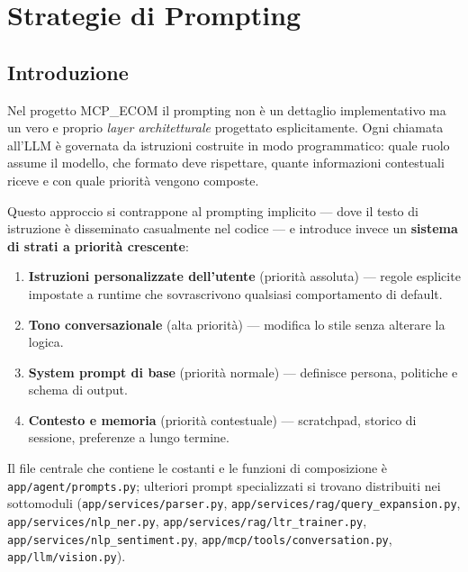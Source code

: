 
\chapter{Strategie di Prompting}
\label{chap:prompting}

\section{Introduzione}
\label{sec:prompt-intro}

Nel progetto MCP\_ECOM il prompting non è un dettaglio implementativo ma
un vero e proprio \emph{layer architetturale} progettato esplicitamente.
Ogni chiamata all'LLM è governata da istruzioni costruite in modo
programmatico: quale ruolo assume il modello, che formato deve rispettare,
quante informazioni contestuali riceve e con quale priorità vengono
composte.

Questo approccio si contrappone al prompting implicito — dove il testo
di istruzione è disseminato casualmente nel codice — e introduce invece
un \textbf{sistema di strati a priorità crescente}:

\begin{enumerate}
    \item \textbf{Istruzioni personalizzate dell'utente} (priorità
        assoluta) — regole esplicite impostate a runtime che sovrascrivono
        qualsiasi comportamento di default.
    \item \textbf{Tono conversazionale} (alta priorità) — modifica lo
        stile senza alterare la logica.
    \item \textbf{System prompt di base} (priorità normale) — definisce
        persona, politiche e schema di output.
    \item \textbf{Contesto e memoria} (priorità contestuale) — scratchpad,
        storico di sessione, preferenze a lungo termine.
\end{enumerate}

Il file centrale che contiene le costanti e le funzioni di composizione è
\texttt{app/agent/prompts.py}; ulteriori prompt specializzati si trovano
distribuiti nei sottomoduli
(\texttt{app/services/parser.py},
\texttt{app/services/rag/query\_expansion.py},
\texttt{app/services/nlp\_ner.py},
\texttt{app/services/rag/ltr\_trainer.py},
\texttt{app/services/nlp\_sentiment.py},
\texttt{app/mcp/tools/conversation.py},
\texttt{app/llm/vision.py}).


